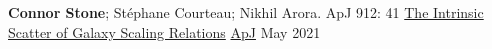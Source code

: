 \begin{cventries}
    
 
    

  \cvpublication
    {{\bf Connor Stone}; St{\'e}phane Courteau; Nikhil Arora. ApJ 912: 41} %
    {\href{https://ui.adsabs.harvard.edu/abs/2021ApJ...912...41S/abstract}{The Intrinsic Scatter of Galaxy Scaling Relations}} %
    {\href{https://iopscience.iop.org/journal/0004-637X}{ApJ}} %
    {May 2021} %
    
    

\end{cventries}
